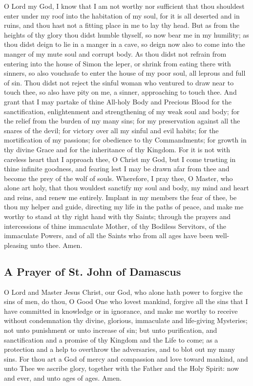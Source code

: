     O Lord my God, I know that I am not worthy nor sufficient that thou shouldest enter under my roof into the habitation of my soul, for it is all deserted and in ruins, and thou hast not a fitting place in me to lay thy head. But as from the heights of thy glory thou didst humble thyself, so now bear me in my humility; as thou didst deign to lie in a manger in a cave, so deign now also to come into the manger of my mute soul and corrupt body. As thou didst not refrain from entering into the house of Simon the leper, or shrink from eating there with sinners, so also vouchsafe to enter the house of my poor soul, all leprous and full of sin. Thou didst not reject the sinful woman who ventured to draw near to touch thee, so also have pity on me, a sinner, approaching to touch thee. And grant that I may partake of thine All-holy Body and Precious Blood for the sanctification, enlightenment and strengthening of my weak soul and body; for the relief from the burden of my many sins; for my preservation against all the snares of the devil; for victory over all my sinful and evil habits; for the mortification of my passions; for obedience to thy Commandments; for growth in thy divine Grace and for the inheritance of thy Kingdom. For it is not with careless heart that I approach thee, O Christ my God, but I come trusting in thine infinite goodness, and fearing lest I may be drawn afar from thee and become the prey of the wolf of souls. Wherefore, I pray thee, O Master, who alone art holy, that thou wouldest sanctify my soul and body, my mind and heart and reins, and renew me entirely. Implant in my members the fear of thee, be thou my helper and guide, directing my life in the paths of peace, and make me worthy to stand at thy right hand with thy Saints; through the prayers and intercessions of thine immaculate Mother, of thy Bodiless Servitors, of the immaculate Powers, and of all the Saints who from all ages have been well-pleasing unto thee. Amen.

\subsection{A Prayer of St. John of Damascus}

    O Lord and Master Jesus Christ, our God, who alone hath power to forgive the sins of men, do thou, O Good One who lovest mankind, forgive all the sins that I have committed in knowledge or in ignorance, and make me worthy to receive without condemnation thy divine, glorious, immaculate and life-giving Mysteries; not unto punishment or unto increase of sin; but unto purification, and sanctification and a promise of thy Kingdom and the Life to come; as a protection and a help to overthrow the adversaries, and to blot out my many sins. For thou art a God of mercy and compassion and love toward mankind, and unto Thee we ascribe glory, together with the Father and the Holy Spirit: now and ever, and unto ages of ages. Amen.

